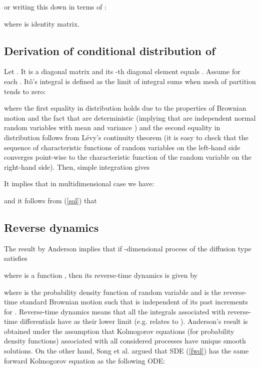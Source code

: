 \documentclass{article}
\begin{document}
or writing this down in terms of :



where  is  identity matrix.



\subsection{Derivation of conditional distribution of }
\label{app:derivation_of_cond_dist}

Let . It is a diagonal matrix and its -th diagonal element  equals . Assume  for each . It\^o's integral  is defined as the limit of integral sums when mesh of partition  tends to zero:



where the first equality in distribution holds due to the properties of Brownian motion and the fact that  are deterministic (implying that  are independent normal random variables with mean  and variance ) and the second equality in distribution follows from L\'evy's continuity theorem (it is easy to check that the sequence of characteristic functions of random variables on the left-hand side converges point-wise to the characteristic function of the random variable on the right-hand side). Then, simple integration gives



It implies that in multidimensional case we have:



and it follows from (\ref{sol}) that







\subsection{Reverse dynamics}
\label{app:reverse_dynamics}
 
The result by Anderson  implies that if -dimensional process of the diffusion type  satisfies



where  is a function , then its reverse-time dynamics is given by



where  is the probability density function of random variable  and  is the reverse-time standard Brownian motion such that  is independent of its past increments  for . Reverse-time dynamics means that all the integrals associated with reverse-time differentials have  as their lower limit (e.g.  relates to ). Anderson's result is obtained under the assumption that Kolmogorov equations (for probability density functions) associated with all considered processes have unique smooth solutions. On the other hand, Song et al.  argued that SDE (\ref{fwd}) has the same forward Kolmogorov equation as the following ODE:
\end{document}
